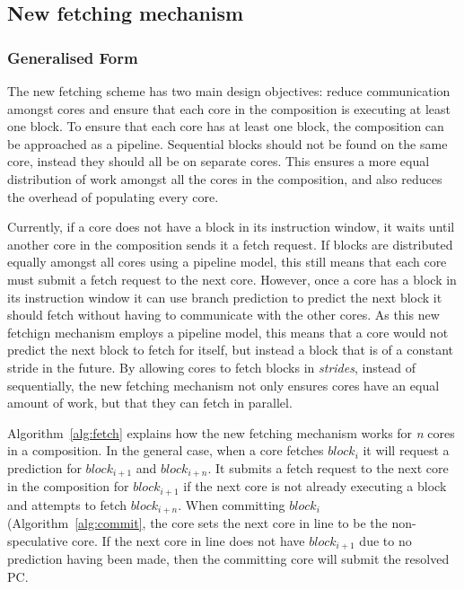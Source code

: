 \subsection{New fetching mechanism}

\subsubsection{Generalised Form}


The new fetching scheme has two main design objectives: reduce communication amongst cores and ensure that each core in the composition is executing at least one block.
To ensure that each core has at least one block, the composition can be approached as a pipeline.
Sequential blocks should not be found on the same core, instead they should all be on separate cores.
This ensures a more equal distribution of work amongst all the cores in the composition, and also reduces the overhead of populating every core.

Currently, if a core does not have a block in its instruction window, it waits until another core in the composition sends it a fetch request.
If blocks are distributed equally amongst all cores using a pipeline model, this still means that each core must submit a fetch request to the next core.
However, once a core has a block in its instruction window it can use branch prediction to predict the next block it should fetch without having to communicate with the other cores.
As this new fetchign mechanism employs a pipeline model, this means that a core would not predict the next block to fetch for itself, but instead a block that is of a constant stride in the future. %
By allowing cores to fetch blocks in \textit{strides}, instead of sequentially, the new fetching mechanism not only ensures cores have an equal amount of work, but that they can fetch in parallel.

Algorithm~\ref{alg:fetch} explains how the new fetching mechanism works for \textit{n} cores in a composition.
In the general case, when a core fetches $block_i$ it will request a prediction for $block_{i+1}$ and $block_{i+n}$.
It submits a fetch request to the next core in the composition for $block_{i+1}$ if the next core is not already executing a block and attempts to fetch $block_{i+n}$.
When committing $block_i$ (Algorithm~\ref{alg:commit}, the core sets the next core in line to be the non-speculative core.
If the next core in line does not have $block_{i+1}$ due to no prediction having been made, then the committing core will submit the resolved PC.

